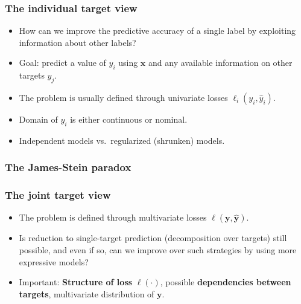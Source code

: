 \documentclass[]{beamer}
\newcommand{\bx}{\boldsymbol{x}}
\newcommand{\by}{\boldsymbol{y}}
\renewcommand{\emph}[1]{\textbf{\color{putblue}#1}}
\begin{document}
\begin{frame}
\frametitle{The individual target view}

\begin{itemize} 
\item How can we improve the predictive accuracy of a single label by exploiting information about other labels?
\item Goal: predict a value of $y_i$ using $\bx$ and any available information on other targets $y_j$.
\item The problem is usually defined through univariate losses $\ell_i(y_i, \hat{y}_i)$.
\item  Domain of $y_i$ is either continuous or nominal.
\item  Independent models vs.\ regularized (shrunken) models.

\end{itemize}

\end{frame}


\begin{frame}
\frametitle{The James-Stein paradox}
\end{frame}


\begin{frame}
\frametitle{The joint target view}

\begin{itemize}
\item The problem is defined through multivariate losses $\ell(\by, \hat{\by})$.
\item Is reduction to single-target prediction (decomposition over targets) still possible, and even if so, can we improve over such strategies by using more expressive models?
\item Important: \emph{Structure of loss} $\ell(\cdot)$, possible \emph{dependencies between targets}, multivariate distribution of $\by$.


\end{itemize}
\end{frame}
\end{document}
